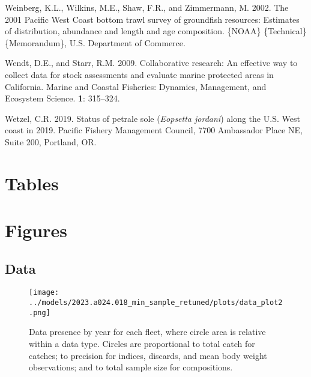 \documentclass[11pt,
  english,
  letterpaper,
]{article}
\newlength{\cslhangindent}
\newenvironment{CSLReferences}[2] %
 {%
  \setlength{\parindent}{0pt}
  \ifodd #1 \everypar{\setlength{\hangindent}{\cslhangindent}}\ignorespaces\fi
  \ifnum #2 > 0
  \setlength{\parskip}{#2\baselineskip}
  \fi
 }%
 {}
\begin{document}
\begin{CSLReferences}{1}{0}
\leavevmode{}%
Weinberg, K.L., Wilkins, M.E., Shaw, F.R., and Zimmermann, M. 2002. The 2001 {Pacific} {West} {Coast} bottom trawl survey of groundfish resources: Estimates of distribution, abundance and length and age composition. \{NOAA\} \{Technical\} \{Memorandum\}, U.S. Department of Commerce.

\leavevmode{}%
Wendt, D.E., and Starr, R.M. 2009. Collaborative research: An effective way to collect data for stock assessments and evaluate marine protected areas in {C}alifornia. Marine and Coastal Fisheries: Dynamics, Management, and Ecosystem Science. \textbf{1}: 315--324.

\leavevmode{}%
Wetzel, C.R. 2019. Status of petrale sole (\emph{{Eopsetta} jordani}) along the {U}.{S}. West coast in 2019. Pacific Fishery Management Council, 7700 Ambassador Place NE, Suite 200, Portland, OR.

\end{CSLReferences}

\clearpage

\hypertarget{tables}{%
\section{Tables}\label{tables}}

\begin{landscape}\end{landscape}

\clearpage

\hypertarget{figures}{%
\section{Figures}\label{figures}}

\hypertarget{data-1}{%
\subsection{Data}\label{data-1}}

\begin{figure}
\centering
\texttt{[image: ../models/2023.a024.018\_min\_sample\_retuned/plots/data\_plot2.png]}
\caption{Data presence by year for each fleet, where circle area is relative within a data type. Circles are proportional to total catch for catches; to precision for indices, discards, and mean body weight observations; and to total sample size for compositions.\label{fig:data-plot}}
\end{figure}
\end{document}

